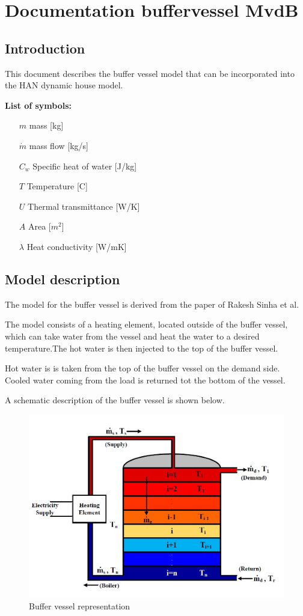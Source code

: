 \section{Documentation buffervessel MvdB}

\subsection{Introduction}

This document describes the buffer vessel model that can be incorporated into the HAN dynamic house model.

\textbf{List of symbols:}

\begin{itemize}
    \item [$m$] {mass [kg]}
    \item [$\dot{m}$] {mass flow [kg/s]}
    \item [$C_w$] {Specific heat of water [J/kg]}
    \item [$T$] {Temperature [C]}
    \item [$U$] {Thermal transmittance [W/K]}
    \item [$A$] {Area [\(m^2\)]}
    \item [$\lambda$] {Heat conductivity [W/mK]}
\end{itemize}

\subsection{Model description}

The model for the buffer vessel is derived from the paper of Rakesh Sinha et al. \cite{sinha2020flexibility}

The model consists of a heating element, located outside of the buffer vessel, which can take water from the vessel and heat the water to a desired temperature.The hot water is then injected to the top of the buffer vessel. 

Hot water is is taken from the top of the buffer vessel on the demand side. Cooled water coming from the load is returned tot the bottom of the vessel.

A schematic description of the buffer vessel is shown below.

\begin{figure}[H]
	\centering
	\includegraphics[width=0.8\columnwidth]{Figures/buffervessel_setup.JPG}
	\caption[Short title]{Buffer vessel representation}
\end{figure}

